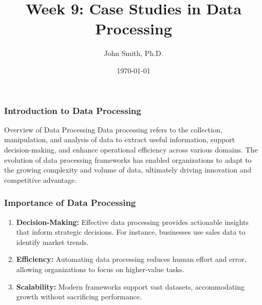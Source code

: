 \documentclass[aspectratio=169]{beamer}
\title[Week 9: Case Studies in Data Processing]{Week 9: Case Studies in Data Processing}
\author[J. Smith]{John Smith, Ph.D.}
\institute[University Name]{
  Department of Computer Science\\
  University Name\\
  \vspace{0.3cm}
  Email: email@university.edu\\
  Website: www.university.edu
}
\date{\today}
\begin{document}
\frame{\titlepage}

\begin{frame}[fragile]
    \frametitle{Introduction to Data Processing}
    \begin{block}{Overview of Data Processing}
        Data processing refers to the collection, manipulation, and analysis of data to extract useful information, support decision-making, and enhance operational efficiency across various domains. The evolution of data processing frameworks has enabled organizations to adapt to the growing complexity and volume of data, ultimately driving innovation and competitive advantage.
    \end{block}
\end{frame}

\begin{frame}[fragile]
    \frametitle{Importance of Data Processing}
    \begin{enumerate}
        \item \textbf{Decision-Making:}
        Effective data processing provides actionable insights that inform strategic decisions. For instance, businesses use sales data to identify market trends.
        
        \item \textbf{Efficiency:}
        Automating data processing reduces human effort and error, allowing organizations to focus on higher-value tasks.
        
        \item \textbf{Scalability:}
        Modern frameworks support vast datasets, accommodating growth without sacrificing performance.
    \end{enumerate}
\end{frame}
\end{document}
